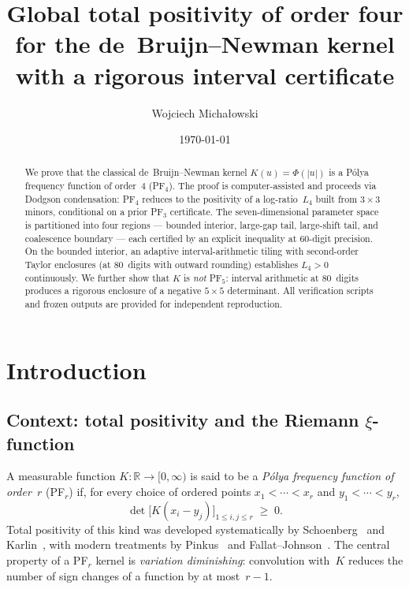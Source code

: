\documentclass[11pt,a4paper]{amsart}
\title[PF$_4$ for the de~Bruijn--Newman kernel]{Global total positivity of order four
for the de~Bruijn--Newman kernel \\
with a rigorous interval certificate}
\author{Wojciech Micha{\l}owski}
\date{\today}
\theoremstyle{definition}
\theoremstyle{remark}
\newcommand{\R}{\mathbb{R}}
\begin{document}
\begin{abstract}
We prove that the classical de~Bruijn--Newman kernel $K(u)=\Phi(|u|)$
is a P\'olya frequency function of order~$4$ (PF$_4$).
The proof is computer-assisted and proceeds via Dodgson condensation:
PF$_4$ reduces to the positivity of a log-ratio~$L_4$ built from
$3\times 3$ minors, conditional on a prior PF$_3$ certificate.
The seven-dimensional parameter space is partitioned into four regions
--- bounded interior, large-gap tail, large-shift tail,
and coalescence boundary --- each certified by an explicit inequality
at $60$-digit precision.
On the bounded interior, an adaptive interval-arithmetic
tiling with second-order Taylor enclosures (at $80$~digits
with outward rounding) establishes $L_4 > 0$ continuously.
We further show that $K$ is \emph{not\/} PF$_5$: interval arithmetic
at $80$~digits produces a rigorous enclosure of a negative
$5\times 5$ determinant.
All verification scripts and frozen outputs are provided for
independent reproduction.
\end{abstract}

\maketitle
\tableofcontents


\section{Introduction}\label{sec:intro}

\subsection{Context: total positivity and the Riemann \texorpdfstring{$\xi$}{xi}-function}

A measurable function $K\colon \R \to [0,\infty)$ is said to be
a \emph{P\'olya frequency function of order~$r$} (PF$_r$) if,
for every choice of ordered points
$x_1 < \cdots < x_r$ and $y_1 < \cdots < y_r$,
\begin{equation}\label{eq:pfr}
  \det\bigl[K(x_i - y_j)\bigr]_{1 \le i,j \le r} \;\ge\; 0.
\end{equation}
Total positivity of this kind was developed systematically by
Schoenberg~\cite{Schoenberg1951} and Karlin~\cite{Karlin1968},
with modern treatments by Pinkus~\cite{Pinkus2010} and Fallat--Johnson~\cite{FallatJohnson2011}.
The central property of a PF$_r$ kernel is \emph{variation diminishing}:
convolution with~$K$ reduces the number of sign changes of a function
by at most~$r-1$.
\end{document}
